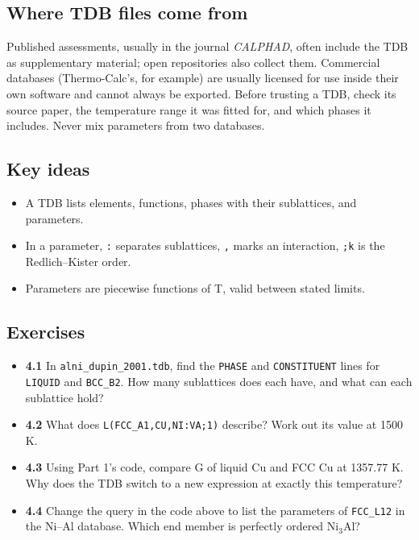 \documentclass[12pt,a4paper]{article}
\begin{document}
\subsection*{Where TDB files come from}
Published assessments, usually in the journal \textit{CALPHAD}, often include the TDB as supplementary material; open repositories also collect them. Commercial databases (Thermo-Calc's, for example) are usually licensed for use inside their own software and cannot always be exported. Before trusting a TDB, check its source paper, the temperature range it was fitted for, and which phases it includes. Never mix parameters from two databases.


\subsection*{Key ideas}
\begin{itemize}
\item A TDB lists elements, functions, phases with their sublattices, and parameters.
\item In a parameter, \texttt{:} separates sublattices, \texttt{,\allowbreak{}} marks an interaction, \texttt{;k} is the Redlich--Kister order.
\item Parameters are piecewise functions of T, valid between stated limits.
\end{itemize}

\subsection*{Exercises}
\begin{itemize}
\item \textbf{4.1} In \texttt{alni\_\allowbreak{}dupin\_\allowbreak{}2001.\allowbreak{}tdb}, find the \texttt{PHASE} and \texttt{CONSTITUENT} lines for \texttt{LIQUID} and \texttt{BCC\_\allowbreak{}B2}. How many sublattices does each have, and what can each sublattice hold?
\item \textbf{4.2} What does \texttt{L(FCC\_\allowbreak{}A1,\allowbreak{}CU,\allowbreak{}NI:VA;1)} describe? Work out its value at 1500 K.
\item \textbf{4.3} Using Part 1's code, compare G of liquid Cu and FCC Cu at 1357.77 K. Why does the TDB switch to a new expression at exactly this temperature?
\item \textbf{4.4} Change the query in the code above to list the parameters of \texttt{FCC\_\allowbreak{}L12} in the Ni--Al database. Which end member is perfectly ordered Ni\(_{3}\)Al?
\end{itemize}
\end{document}
